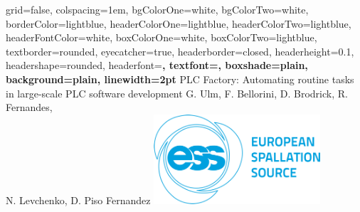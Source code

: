 \documentclass[portrait,final,a0paper,fontscale=0.277]{baposter}
\begin{document}
\begin{poster}%
  {
  grid=false,
  colspacing=1em,
  bgColorOne=white,
  bgColorTwo=white,
  borderColor=lightblue,
  headerColorOne=lightblue,
  headerColorTwo=lightblue,
  headerFontColor=white,
  boxColorOne=white,
  boxColorTwo=lightblue,
  textborder=rounded,
  eyecatcher=true,
  headerborder=closed,
  headerheight=0.1\textheight,
  headershape=rounded,
  headerfont=\Large\bf\textsc, %
  textfont={\setlength{\parindent}{1.5em}},
  boxshade=plain,
  background=plain,
  linewidth=2pt
  }
  {} 
  {PLC Factory: Automating routine tasks in large-scale PLC software development \vspace{0.2em}}
  {G. Ulm, F. Bellorini, D. Brodrick, R. Fernandes,\\ N. Levchenko, D. Piso Fernandez}
  {%
    \includegraphics[height=9.0em]{logo/ESS}
  }
  
  
  
  
  
  
  



    \newcommand{\colouredcircle}{%
      \tikz{\useasboundingbox (-0.2em,-0.32em) rectangle(0.2em,0.32em); \draw[draw=black,fill=lightblue,line width=0.03em] (0,0) circle(0.18em);}}



\end{poster}
\end{document}

